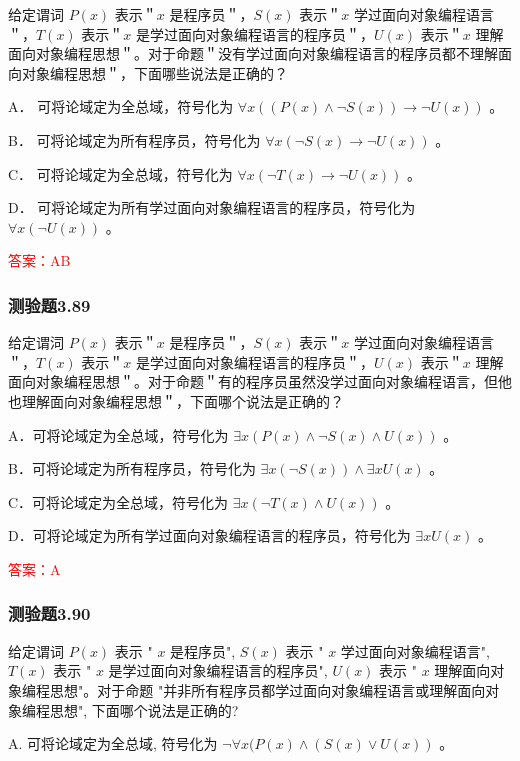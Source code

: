 \documentclass[UTF8, heading=true]{ctexart}
\begin{document}
给定谓词 $P(x)$ 表示＂$x$ 是程序员＂，$S(x)$ 表示＂$x$ 学过面向对象编程语言＂，$T(x)$ 表示＂$x$ 是学过面向对象编程语言的程序员＂，$U(x)$ 表示＂$x$ 理解面向对象编程思想＂。对于命题＂没有学过面向对象编程语言的程序员都不理解面向对象编程思想＂，下面哪些说法是正确的？

A．
可将论域定为全总域，符号化为 $\forall x((P(x) \wedge \neg S(x)) \rightarrow \neg U(x))$ 。

B．
可将论域定为所有程序员，符号化为 $\forall x(\neg S(x) \rightarrow \neg U(x))$ 。

C．
可将论域定为全总域，符号化为 $\forall x(\neg T(x) \rightarrow \neg U(x))$ 。

D．
可将论域定为所有学过面向对象编程语言的程序员，符号化为 $\forall x(\neg U(x))$ 。

\textcolor{red}{答案：AB}

\subsubsection{测验题3.89}

给定谓泀 $P(x)$ 表示＂$x$ 是程序员＂，$S(x)$ 表示＂$x$ 学过面向对象编程语言＂，$T(x)$ 表示＂$x$ 是学过面向对象编程语言的程序员＂，$U(x)$ 表示＂$x$ 理解面向对象编程思想＂。对于命题＂有的程序员虽然没学过面向对象编程语言，但他也理解面向对象编程思想＂，下面哪个说法是正确的？

A．可将论域定为全总域，符号化为 $\exists x(P(x) \wedge \neg S(x) \wedge U(x))$ 。

B．可将论域定为所有程序员，符号化为 $\exists x(\neg S(x)) \wedge \exists x U(x)$ 。

C．可将论域定为全总域，符号化为 $\exists x(\neg T(x) \wedge U(x))$ 。

D．可将论域定为所有学过面向对象编程语言的程序员，符号化为 $\exists x U(x)$ 。


\textcolor{red}{答案：A}

\subsubsection{测验题3.90}

给定谓词 $P(x)$ 表示 " $x$ 是程序员", $S(x)$ 表示 " $x$ 学过面向对象编程语言", $T(x)$ 表示 " $x$ 是学过面向对象编程语言的程序员", $U(x)$ 表示 " $x$ 理解面向对象编程思想"。对于命题 "并非所有程序员都学过面向对象编程语言或理解面向对象编程思想", 下面哪个说法是正确的?

A. 可将论域定为全总域, 符号化为 $\neg \forall x(P(x) \wedge(S(x) \vee U(x))$ 。
\end{document}

